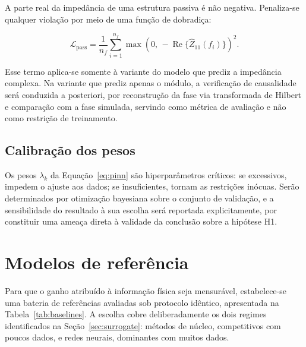 A parte real da impedância de uma estrutura passiva é não negativa. Penaliza-se
qualquer violação por meio de uma função de dobradiça:

\begin{equation}
\mathcal{L}_{\text{pass}} = \frac{1}{n_f}\sum_{i=1}^{n_f}
   \max\!\left(0,\, -\operatorname{Re}\{\hat{Z}_{11}(f_i)\}\right)^2 .
\label{eq:l_pass}
\end{equation}

Esse termo aplica-se somente à variante do modelo que prediz a impedância
complexa. Na variante que prediz apenas o módulo, a verificação de causalidade
será conduzida a posteriori, por reconstrução da fase via transformada de
Hilbert e comparação com a fase simulada, servindo como métrica de avaliação e
não como restrição de treinamento.

\subsection{Calibração dos pesos}

Os pesos $\lambda_k$ da Equação~\ref{eq:pinn} são hiperparâmetros críticos: se
excessivos, impedem o ajuste aos dados; se insuficientes, tornam as restrições
inócuas. Serão determinados por otimização bayesiana sobre o conjunto de
validação, e a sensibilidade do resultado à sua escolha será reportada
explicitamente, por constituir uma ameaça direta à validade da conclusão sobre a
hipótese H1.

\section{Modelos de referência}
\label{sec:baselines}

Para que o ganho atribuído à informação física seja mensurável, estabelece-se uma
bateria de referências avaliadas sob protocolo idêntico, apresentada na
Tabela~\ref{tab:baselines}. A escolha cobre deliberadamente os dois regimes
identificados na Seção~\ref{sec:surrogate}: métodos de núcleo, competitivos com
poucos dados, e redes neurais, dominantes com muitos dados.

